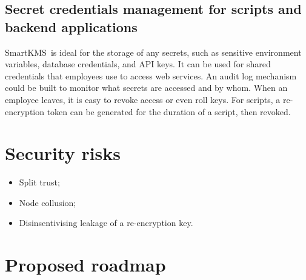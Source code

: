 \documentclass[notitlepage,longbibliography]{revtex4-1}
\newcommand{\kms}{SmartKMS}
\begin{document}
\subsection{Secret credentials management for scripts and backend applications}
\kms~is ideal for the storage of any secrets, such as sensitive environment variables, database credentials, and API keys.
It can be used for shared credentials that employees use to access web services.
An audit log mechanism could be built to monitor what secrets are accessed and by whom.
When an employee leaves, it is easy to revoke access or even roll keys.
For scripts, a re-encryption token can be generated for the duration of a script, then revoked.

\section{Security risks}

\begin{itemize}
    \item Split trust;
    \item Node collusion;
    \item Disinsentivising leakage of a re-encryption key.
\end{itemize}

\section{Proposed roadmap}


\end{document}
